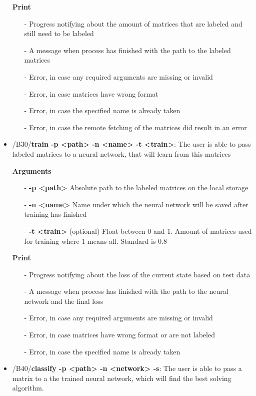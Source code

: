 \documentclass[parskip=full]{scrartcl}
\begin{document}
\begin{itemize}
\textbf{Print}
	\begin{itemize}
	\item[-]Progress notifying about the amount of matrices that are labeled and still need to be labeled
	\item[-]A message when process has finished with the path to the labeled matrices
	\item[-]Error, in case any required arguments are missing or invalid
	\item[-]Error, in case matrices have wrong format
	\item[-]Error, in case the specified name is already taken
	\item[-]Error, in case the remote fetching of the matrices did result in an error
	\end{itemize}

\item/B30/\textbf{train -p <path> -n <name> -t <train>}:
\newline The user is able to pass labeled matrices to a neural network, that will learn from this matrices

\textbf{Arguments}
	\begin{itemize}
	\item[-]\textbf{-p <path>} Absolute path to the labeled matrices on the local storage
	\item[-]\textbf{-n <name>} Name under which the neural network will be saved after training has finished
	\item[-]\textbf{-t <train>} (optional) Float between 0 and 1. Amount of matrices used for training where 1 means all. Standard is 0.8
	\end{itemize}

\textbf{Print}
	\begin{itemize}
	\item[-]Progress notifying about the loss of the current state based on test data
	\item[-]A message when process has finished with the path to the neural network and the final loss
	\item[-]Error, in case any required arguments are missing or invalid
	\item[-]Error, in case matrices have wrong format or are not labeled
	\item[-]Error, in case the specified name is already taken
	\end{itemize}

\item/B40/\textbf{classify -p <path> -n <network> -s}:
\newline The user is able to pass a matrix to a the trained neural network, which will find the best solving algorithm.


\end{itemize}
\end{document}
